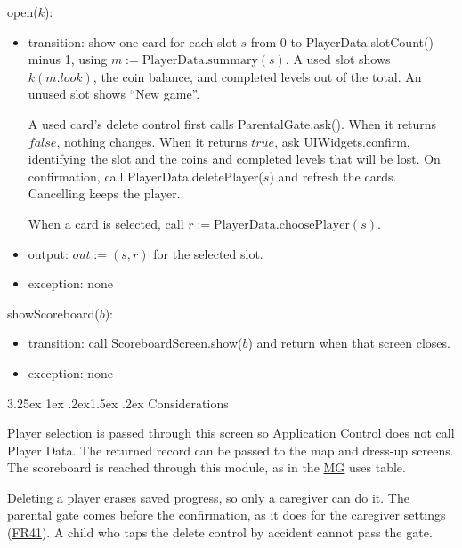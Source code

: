 \documentclass[10pt, titlepage]{article}
\makeatletter
\newcommand{\srsurl}{https://team-hindsight.github.io/ophthamology-game/SRS/SRS.pdf}
\newcommand{\srsitemref}[2]{\href{\srsurl\#nameddest=#1}{#2}}
\newcommand{\mgurl}{https://github.com/team-hindsight/ophthamology-game/blob/main/pdfs/Design/SoftArchitecture/MG.pdf}
\newcommand{\mg}{\href{\mgurl}{MG}}
\renewcommand\paragraph{\@startsection{paragraph}{4}{\z@}%
  {3.25ex \@plus 1ex \@minus .2ex}{1.5ex \@plus .2ex}%
  {\normalfont\normalsize\bfseries}}
\newcommand{\T}[1]{\mathit{#1}}          %
\newcommand{\out}{\mathit{out}}
\newcommand{\true}{\mathit{true}}
\newcommand{\false}{\mathit{false}}
\makeatother
\begin{document}
\begin{samepage}
\noindent open($k$):
\begin{itemize}
\item transition: show one card for each slot $s$ from 0 to
  PlayerData.slotCount() minus 1, using
  $m := \text{PlayerData.summary}(s)$. A used slot shows
  $k(m.\T{look})$, the coin balance, and completed levels out of
  the total. An unused slot shows ``New game''.

  A used card's delete control first calls ParentalGate.ask(). When it
  returns $\false$, nothing changes. When it returns $\true$, ask
  UIWidgets.confirm, identifying the slot and the coins and completed
  levels that will be lost. On confirmation, call
  PlayerData.deletePlayer($s$) and refresh the cards. Cancelling keeps
  the player.

  When a card is selected, call
  $r := \text{PlayerData.choosePlayer}(s)$.
\item output: $\out := (s,r)$ for the selected slot.
\item exception: none
\end{itemize}
\end{samepage}
\par\pagebreak[0]

\begin{samepage}
\noindent showScoreboard($b$):
\begin{itemize}
\item transition: call ScoreboardScreen.show($b$) and return when
  that screen closes.
\item exception: none
\end{itemize}
\end{samepage}
\par\pagebreak[0]

\paragraph{Considerations}

Player selection is passed through this screen so Application Control
does not call Player Data. The returned record can be passed to the
map and dress-up screens. The scoreboard is reached through this
module, as in the \mg{} uses table.

Deleting a player erases saved progress, so only a caregiver can do it.
The parental gate comes before the confirmation, as it does for the
caregiver settings (\srsitemref{FR_ParentGate}{FR41}). A child who taps the
delete control by accident cannot pass the gate.
\end{document}
